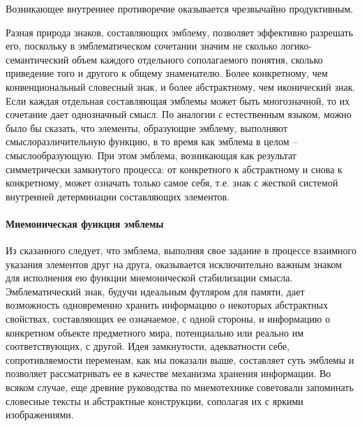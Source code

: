 Возникающее внутреннее противоречие оказывается чрезвычайно продуктивным.

Разная природа знаков, составляющих эмблему, позволяет эффективно разрешать его, поскольку в
эмблематическом сочетании значим не сколько логико-семантический объем каждого отдельного
сополагаемого понятия, сколько приведение того и другого к общему знаменателю. Более конкретному,
чем конвенциональный словесный знак, и более абстрактному, чем иконический знак. Если каждая
отдельная составляющая эмблемы может быть многозначной, то их сочетание дает однозначный смысл. По
аналогии с естественным языком, можно было бы сказать, что элементы, образующие эмблему, выполняют
смыслоразличительную функцию, в то время как эмблема в целом -- смыслообразующую. При этом эмблема,
возникающая как результат симметрически замкнутого процесса: от конкретного к абстрактному и снова к
конкретному, может означать только самое себя, т.е. знак с жесткой системой внутренней детерминации
составляющих элементов.

\paragraph{Мнемоническая функция эмблемы}

Из сказанного следует, что эмблема, выполняя свое задание в процессе взаимного указания элементов
друг на друга, оказывается исключительно важным знаком для исполнения ею функции мнемонической
стабилизации смысла. Эмблематический знак, будучи идеальным футляром для памяти, дает возможность
одновременно хранить информацию о некоторых абстрактных свойствах, составляющих ее означаемое, с
одной стороны, и информацию о конкретном объекте предметного мира, потенциально или реально им
соответствующих, с другой. Идея замкнутости, адекватности себе, сопротивляемости переменам, как мы
показали выше, составляет суть эмблемы и позволяет рассматривать ее в качестве механизма хранения
информации. Во всяком случае, еще древние руководства по мнемотехнике советовали запоминать
словесные тексты и абстрактные конструкции, сополагая их с яркими изображениями.\autocite[][49]{grigoreva2005}

